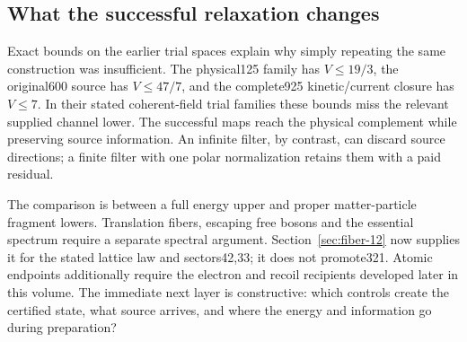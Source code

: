 \subsection{What the successful relaxation changes}

Exact bounds on the earlier trial spaces explain why simply repeating the
same construction was insufficient. The physical125 family has $V\leq19/3$,
the original600 source has $V\leq47/7$, and the complete925 kinetic/current
closure has $V\leq7$. In their stated coherent-field trial families these
bounds miss the relevant supplied channel lower. The successful maps reach
the physical complement while preserving source information. An infinite
filter, by contrast, can discard source directions; a finite filter with
one polar normalization retains them with a paid residual.

The comparison is between a full energy upper and proper matter-particle
fragment lowers. Translation fibers, escaping free bosons and the essential spectrum require a separate spectral argument. Section~\ref{sec:fiber-12} now supplies it for the stated lattice law and sectors42,33; it does not promote321. Atomic endpoints additionally require the electron and recoil
recipients developed later in this volume. The immediate next layer is
constructive: which controls create the certified state, what source
arrives, and where the energy and information go during preparation?

